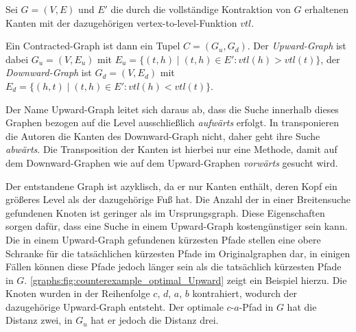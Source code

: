 \begin{definition}
  Sei $G = (V, E)$ und $E'$ die durch die vollständige Kontraktion von $G$ erhaltenen Kanten mit der dazugehörigen vertex-to-level-Funktion ${vtl}$.

  Ein Contracted-Graph ist dann ein Tupel $C = (G_u, G_d)$. Der \emph{Upward-Graph} ist dabei $G_u = (V, E_u)$ mit $E_u = \{ (t, h) \mid (t, h) \in E' \colon {vtl}(h) > {vtl}(t) \}$, der \emph{Downward-Graph} ist $G_d = (V, E_d)$ mit $E_d = \{ (h, t) \mid (t, h) \in E' \colon {vtl}(h) < {vtl}(t) \}$.
\end{definition}

Der Name Upward-Graph leitet sich daraus ab, dass die Suche innerhalb dieses Graphen bezogen auf die Level ausschließlich \emph{aufwärts} erfolgt.
In \cite{geisberger2008contraction} transponieren die Autoren die Kanten des Downward-Graph nicht, daher geht ihre Suche \emph{abwärts}.
Die Transposition der Kanten ist hierbei nur eine Methode, damit auf dem Downward-Graphen wie auf dem Upward-Graphen \emph{vorwärts} gesucht wird.

Der entstandene Graph ist azyklisch, da er nur Kanten enthält, deren Kopf ein größeres Level als der dazugehörige Fuß hat.
Die Anzahl der in einer Breitensuche gefundenen Knoten ist geringer als im Ursprungsgraph.
Diese Eigenschaften sorgen dafür, dass eine Suche in einem Upward-Graph kostengünstiger sein kann.
Die in einem Upward-Graph gefundenen kürzesten Pfade stellen eine obere Schranke für die tatsächlichen kürzesten Pfade im Originalgraphen dar, in einigen Fällen können diese Pfade jedoch länger sein als die tatsächlich kürzesten Pfade in $G$.
\autoref{graphs:fig:counterexample_optimal_Upward} zeigt ein Beispiel hierzu.
Die Knoten wurden in der Reihenfolge $c$, $d$, $a$, $b$ kontrahiert, wodurch der dazugehörige Upward-Graph entsteht.
Der optimale $c$-$a$-Pfad in $G$ hat die Distanz zwei, in $G_u$ hat er jedoch die Distanz drei.

